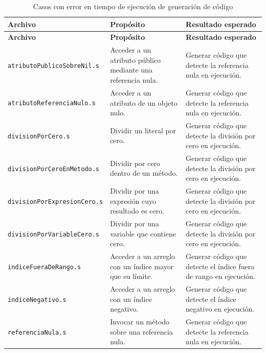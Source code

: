 \begingroup
\small
\renewcommand{\arraystretch}{1.2}
\setlength{\tabcolsep}{5pt}
\setlength{\LTleft}{0pt}
\setlength{\LTright}{0pt plus 1fill}
\begin{longtable}{|>{\raggedright\arraybackslash}p{}|>{\raggedright\arraybackslash}p{}|>{\raggedright\arraybackslash}p{}|}
\caption{Casos con error en tiempo de ejecución de generación de código}\label{tab:codegen-error}\\
\hline
\textbf{Archivo} & \textbf{Propósito} & \textbf{Resultado esperado} \\ \hline
\endfirsthead
\hline
\textbf{Archivo} & \textbf{Propósito} & \textbf{Resultado esperado} \\ \hline
\endhead
\texttt{atributoPublicoSobreNil\allowbreak .s} & Acceder a un atributo público mediante una referencia nula. & Generar código que detecte la referencia nula en ejecución. \\ \hline
\texttt{atributoReferenciaNulo\allowbreak .s} & Acceder a un atributo de un objeto nulo. & Generar código que detecte la referencia nula en ejecución. \\ \hline
\texttt{divisionPorCero\allowbreak .s} & Dividir un literal por cero. & Generar código que detecte la división por cero en ejecución. \\ \hline
\texttt{divisionPorCeroEnMetodo\allowbreak .s} & Dividir por cero dentro de un método. & Generar código que detecte la división por cero en ejecución. \\ \hline
\texttt{divisionPorExpresionCero\allowbreak .s} & Dividir por una expresión cuyo resultado es cero. & Generar código que detecte la división por cero en ejecución. \\ \hline
\texttt{divisionPorVariableCero\allowbreak .s} & Dividir por una variable que contiene cero. & Generar código que detecte la división por cero en ejecución. \\ \hline
\texttt{indiceFueraDeRango\allowbreak .s} & Acceder a un arreglo con un índice mayor que su límite. & Generar código que detecte el índice fuera de rango en ejecución. \\ \hline
\texttt{indiceNegativo\allowbreak .s} & Acceder a un arreglo con un índice negativo. & Generar código que detecte el índice negativo en ejecución. \\ \hline
\texttt{referenciaNula\allowbreak .s} & Invocar un método sobre una referencia nula. & Generar código que detecte la referencia nula en ejecución. \\ \hline

\end{longtable}
